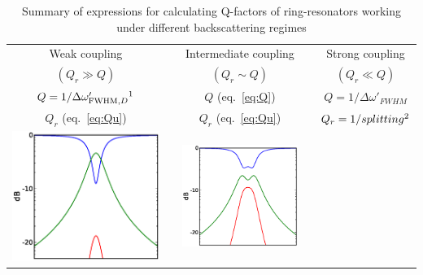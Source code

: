 \documentclass[10pt,letterpaper]{article}
\begin{document}
\begin{table}[ht]
	\renewcommand{\arraystretch}{1.3}
	\caption{Summary of expressions for calculating Q-factors of ring-resonators working under different backscattering regimes}
	\centering
	\begin{tabular}{ccccc}
	\hline
	Weak coupling && Intermediate coupling && Strong coupling\\
	$(Q_r \gg Q)$ && $(Q_r \sim Q)$ && $(Q_r \ll Q)$\\
	\cline{1-1} \cline{3-3} \cline{5-5}
	$Q=1/\Delta\omega'_{\mbox{\scriptsize{FWHM}},D}\footnotemark[1]$&&$Q$ (eq.~\ref{eq:Q})&&$Q=1/\Delta\omega'_{FWHM}$\\
	$Q_r$ (eq.~\ref{eq:Qu})&&$Q_r$ (eq.~\ref{eq:Qu})&&$Q_r=1/splitting\footnotemark[2]$\\
	\includegraphics[scale=0.4]{graphic0.eps}&&\includegraphics[scale=0.4]{graphic1.eps}&&\includegraphics[scale
\end{tabular}
\end{table}
\end{document}
